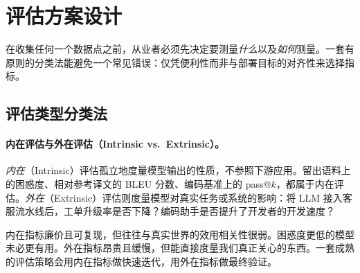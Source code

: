 \section{评估方案设计}
\label{subsec:eval-scheme}

在收集任何一个数据点之前，从业者必须先决定要测量\emph{什么}以及\emph{如何}测量。一套有原则的分类法能避免一个常见错误：仅凭便利性而非与部署目标的对齐性来选择指标。

\subsection{评估类型分类法}
\label{taxonomy-of-evaluation-types}

\paragraph{内在评估与外在评估（Intrinsic vs.~Extrinsic）。}
\label{intrinsic-vs.-extrinsic-evaluation.}

\emph{内在}（Intrinsic）评估孤立地度量模型输出的性质，不参照下游应用。留出语料上的困惑度、相对参考译文的 BLEU 分数、编码基准上的 pass@$k$，都属于内在评估。\emph{外在}（Extrinsic）评估则度量模型对真实任务或系统的影响：将 LLM 接入客服流水线后，工单升级率是否下降？编码助手是否提升了开发者的开发速度？

\begin{intuitionbox}[内在—外在差距]
内在指标廉价且可复现，但往往与真实世界的效用相关性很弱。困惑度更低的模型未必更有用。外在指标昂贵且缓慢，但能直接度量我们真正关心的东西。一套成熟的评估策略会用内在指标做快速迭代，用外在指标做最终验证。
\end{intuitionbox}

